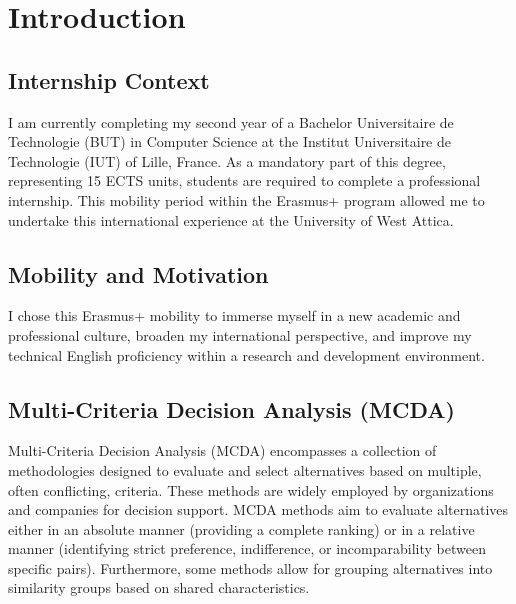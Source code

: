 \documentclass[12pt,a4paper,oneside]{report}
\begin{document}
\cleardoublepage
\tableofcontents
\cleardoublepage
{}
{}
\listoffigures

\cleardoublepage
{}
{}
\listoftables

\cleardoublepage
{}
\setcounter{page}{1}

\renewcommand{\thechapter}{\arabic{chapter}}
\renewcommand{\thesection}{\arabic{chapter}.\arabic{section}}

\chapter{Introduction}

\section{Internship Context}
I am currently completing my second year of a Bachelor Universitaire de Technologie (BUT) in Computer Science at the Institut Universitaire de Technologie (IUT) of Lille, France. As a mandatory part of this degree, representing 15 ECTS units, students are required to complete a professional internship. This mobility period within the Erasmus+ program allowed me to undertake this international experience at the University of West Attica.

\section{Mobility and Motivation}
I chose this Erasmus+ mobility to immerse myself in a new academic and professional culture, broaden my international perspective, and improve my technical English proficiency within a research and development environment.

\section{Multi-Criteria Decision Analysis (MCDA)}
Multi-Criteria Decision Analysis (MCDA) encompasses a collection of methodologies designed to evaluate and select alternatives based on multiple, often conflicting, criteria. These methods are widely employed by organizations and companies for decision support. MCDA methods aim to evaluate alternatives either in an absolute manner (providing a complete ranking) or in a relative manner (identifying strict preference, indifference, or incomparability between specific pairs). Furthermore, some methods allow for grouping alternatives into similarity groups based on shared characteristics.
\end{document}

